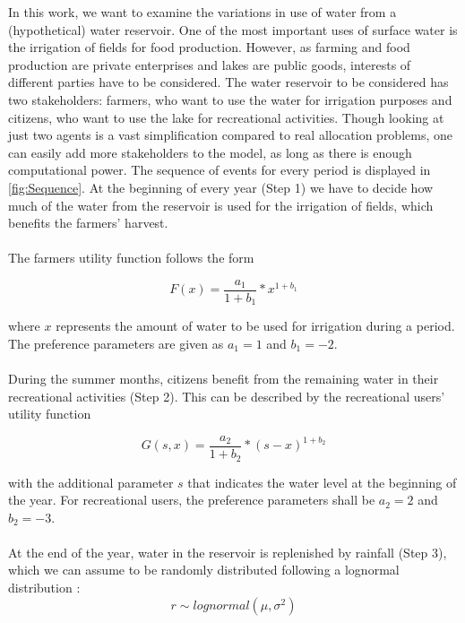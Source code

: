 \documentclass[12pt, a4paper, oneside]{article}
\begin{document}
In this work, we want to examine the variations in use of water from a (hypothetical) water reservoir.
One of the most important uses of surface water is the irrigation of fields for food production. However, as farming and food production are private enterprises and lakes are public goods, interests of different parties have to be considered. 
The water reservoir to be considered has two stakeholders: farmers, who want to use the water for irrigation purposes and citizens, who want to use the lake for recreational activities. 
Though looking at just two agents is a vast simplification compared to real allocation problems, one can easily add more stakeholders to the model, as long as there is enough computational power.
The sequence of events for every period is displayed in \ref{fig:Sequence}. %
At the beginning of every year (Step 1) we have to decide how much of the water from the reservoir is used for the irrigation of fields, which benefits the farmers' harvest.\\\\
The farmers utility function follows the form 

\begin{equation}
	F(x) = \frac{a_1}{1+b_1} * x^{1+b_1}
\end{equation}

where $x$ represents the amount of water to be used for irrigation during a period. 
The preference parameters are given as $a_1 = 1$ and $b_1 = -2$.\\\\

During the summer months, citizens benefit from the remaining water in their recreational activities (Step 2).
This can be described by the recreational users' utility function 

\begin{equation}
  G(s, x) = \frac{a_2}{1+b_2} * (s-x)^{1+b_2}
\end{equation}

with the additional parameter $s$ that indicates the water level at the beginning of the year.
For recreational users, the preference parameters shall be $a_2 = 2$ and $b_2 = -3$.\\\\

At the end of the year, water in the reservoir is replenished by rainfall (Step 3), which we can assume to be randomly distributed following a lognormal distribution \citep{oosterbaan1994frequency}: %
\begin{equation}
	r \sim lognormal(\mu, \sigma^2)
\end{equation}
\end{document}
